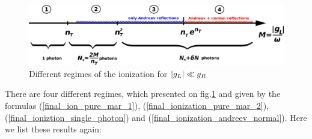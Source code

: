 \begin{figure}[H]
	\centering
	\includegraphics[width=0.9\linewidth]{images/scale}
	\caption{Different regimes of the ionization for $ \left|g_L\right|\ll g_R $}
	\label{fig:scale}
\end{figure}
 There are four different regimes, which presented on fig.\ref{fig:scale} and given by the formulas (\ref{final_ion_pure_mar_1}),  (\ref{final_ionization_pure_mar_2}),  (\ref{final_ioniztion_single_photon}) and (\ref{final_ionization_andreev_normal}). Here we list these results again:
